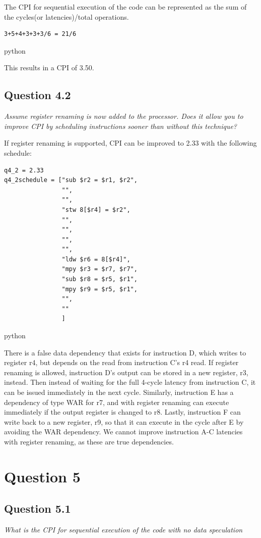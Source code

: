 \documentclass[
	letterpaper, %
]{jdf}
\begin{document}
The CPI for sequential execution of the code can be represented as the sum of the cycles(or latencies)/total operations.
\begin{verbatim}
3+5+4+3+3+3/6 = 21/6 
\end{verbatim}{python}

This results in a CPI of 3.50.

\subsection{Question 4.2}
\textit{Assume register renaming is now added to the processor. Does it allow you to improve CPI by scheduling instructions sooner than without this technique?}

If register renaming is supported, CPI can be improved to 2.33 with the following schedule:

\begin{verbatim}
q4_2 = 2.33
q4_2schedule = ["sub $r2 = $r1, $r2",
                "",
                "",
                "stw 8[$r4] = $r2",
                "",
                "",
                "",
                "",
                "ldw $r6 = 8[$r4]",
                "mpy $r3 = $r7, $r7",
                "sub $r8 = $r5, $r1",
                "mpy $r9 = $r5, $r1",
                "",
                ""
                ]
\end{verbatim}{python}

There is a false data dependency that exists for instruction D, which writes to register r4, but depends on the read from instruction C's r4 read. If register renaming is allowed, instruction D's output can be stored in a new register, r3, instead. Then instead of waiting for the full 4-cycle latency from instruction C, it can be issued immediately in the next cycle. Similarly, instruction E has a dependency of type WAR for r7, and with register renaming can execute immediately if the output register is changed to r8. Lastly, instruction F can write back to a new register, r9, so that it can execute in the cycle after E by avoiding the WAR dependency. We cannot improve instruction A-C latencies with register renaming, as these are true dependencies.

\section{Question 5}
\subsection{Question 5.1}
\textit{What is the CPI for sequential execution of the code with no data speculation}
\end{document}
